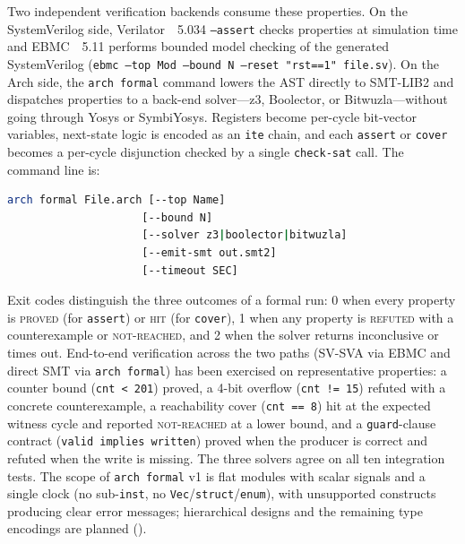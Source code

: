 \documentclass[manuscript]{acmart}
\begin{document}
Two independent verification backends consume these properties. On the SystemVerilog side, Verilator~\cite{verilator}~5.034 \texttt{--assert} checks properties at simulation time and EBMC~\cite{ebmc}~5.11 performs bounded model checking of the generated SystemVerilog (\texttt{ebmc --top Mod --bound N --reset "rst==1" file.sv}). On the Arch side, the \texttt{arch formal} command lowers the AST directly to SMT-LIB2 and dispatches properties to a back-end solver---z3, Boolector, or Bitwuzla---without going through Yosys or SymbiYosys. Registers become per-cycle bit-vector variables, next-state logic is encoded as an \texttt{ite} chain, and each \texttt{assert} or \texttt{cover} becomes a per-cycle disjunction checked by a single \texttt{check-sat} call. The command line is:

\begin{lstlisting}[language=bash]
arch formal File.arch [--top Name]
                     [--bound N]
                     [--solver z3|boolector|bitwuzla]
                     [--emit-smt out.smt2]
                     [--timeout SEC]
\end{lstlisting}

Exit codes distinguish the three outcomes of a formal run: 0 when every property is \textsc{proved} (for \texttt{assert}) or \textsc{hit} (for \texttt{cover}), 1 when any property is \textsc{refuted} with a counterexample or \textsc{not-reached}, and 2 when the solver returns inconclusive or times out. End-to-end verification across the two paths (SV-SVA via EBMC and direct SMT via \texttt{arch formal}) has been exercised on representative properties: a counter bound (\texttt{cnt < 201}) proved, a 4-bit overflow (\texttt{cnt != 15}) refuted with a concrete counterexample, a reachability cover (\texttt{cnt == 8}) hit at the expected witness cycle and reported \textsc{not-reached} at a lower bound, and a \texttt{guard}-clause contract (\texttt{valid implies written}) proved when the producer is correct and refuted when the write is missing. The three solvers agree on all ten integration tests. The scope of \texttt{arch formal} v1 is flat modules with scalar signals and a single clock (no sub-\texttt{inst}, no \texttt{Vec}/\texttt{struct}/\texttt{enum}), with unsupported constructs producing clear error messages; hierarchical designs and the remaining type encodings are planned ().

\end{document}
